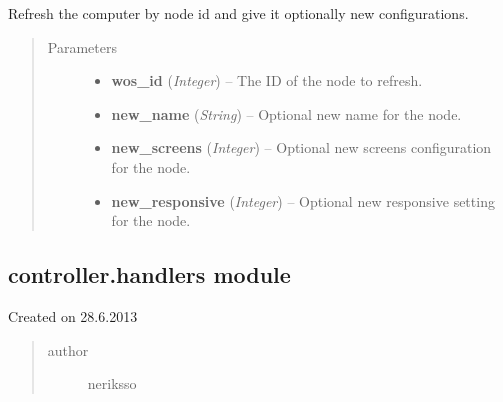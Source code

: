 \documentclass[letterpaper,10pt,english]{sphinxmanual}
\begin{document}

\begin{fulllineitems}
\label{controller:controller.computer.refresh_computer_by_wos_id}
Refresh the computer by node id and give it optionally new configurations.
\begin{quote}\begin{description}
\item[{Parameters}] \leavevmode\begin{itemize}
\item {} 
\textbf{wos\_id} (\emph{Integer}) -- The ID of the node to refresh.

\item {} 
\textbf{new\_name} (\emph{String}) -- Optional new name for the node.

\item {} 
\textbf{new\_screens} (\emph{Integer}) -- Optional new screens configuration for the node.

\item {} 
\textbf{new\_responsive} (\emph{Integer}) -- Optional new responsive setting for the node.

\end{itemize}

\end{description}\end{quote}

\end{fulllineitems}



\subsection{controller.handlers module}
\label{controller:module-controller.handlers}\label{controller:controller-handlers-module}
Created on 28.6.2013
\begin{quote}\begin{description}
\item[{author}] \leavevmode
neriksso

\end{description}\end{quote}
\end{document}

